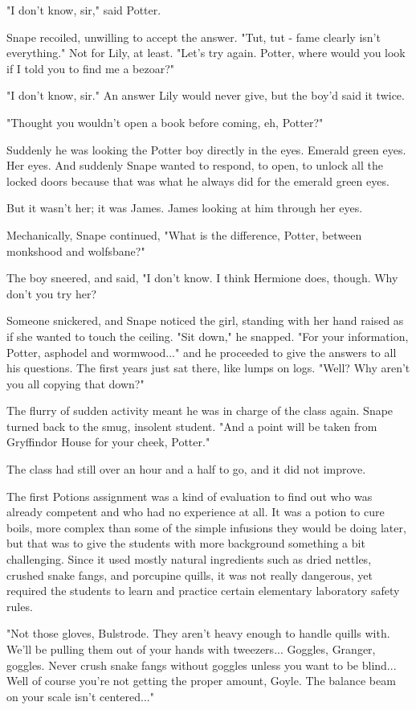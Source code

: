 \documentclass[a4paper,11pt]{article}
\begin{document}
"I don't know, sir," said Potter.

Snape recoiled, unwilling to accept the answer. "Tut, tut - fame clearly isn't everything." Not for Lily, at least. "Let's try again. Potter, where would you look if I told you to find me a bezoar?"

"I don't know, sir." An answer Lily would never give, but the boy'd said it twice.

"Thought you wouldn't open a book before coming, eh, Potter?"

Suddenly he was looking the Potter boy directly in the eyes. Emerald green eyes. Her eyes. And suddenly Snape wanted to respond, to open, to unlock all the locked doors because that was what he always did for the emerald green eyes.

But it wasn't her; it was James. James looking at him through her eyes.

Mechanically, Snape continued, "What is the difference, Potter, between monkshood and wolfsbane?"

The boy sneered, and said, "I don't know. I think Hermione does, though. Why don't you try her?

Someone snickered, and Snape noticed the girl, standing with her hand raised as if she wanted to touch the ceiling. "Sit down," he snapped. "For your information, Potter, asphodel and wormwood..." and he proceeded to give the answers to all his questions. The first years just sat there, like lumps on logs. "Well? Why aren't you all copying that down?"

The flurry of sudden activity meant he was in charge of the class again. Snape turned back to the smug, insolent student. "And a point will be taken from Gryffindor House for your cheek, Potter."

The class had still over an hour and a half to go, and it did not improve.

The first Potions assignment was a kind of evaluation to find out who was already competent and who had no experience at all. It was a potion to cure boils, more complex than some of the simple infusions they would be doing later, but that was to give the students with more background something a bit challenging. Since it used mostly natural ingredients such as dried nettles, crushed snake fangs, and porcupine quills, it was not really dangerous, yet required the students to learn and practice certain elementary laboratory safety rules.

"Not those gloves, Bulstrode. They aren't heavy enough to handle quills with. We'll be pulling them out of your hands with tweezers... Goggles, Granger, goggles. Never crush snake fangs without goggles unless you want to be blind... Well of course you're not getting the proper amount, Goyle. The balance beam on your scale isn't centered..."
\end{document}
